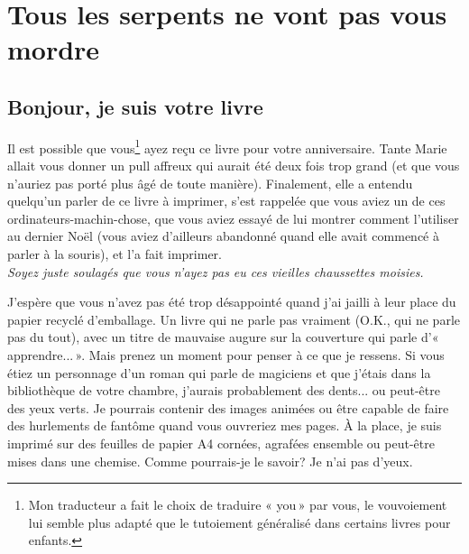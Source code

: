 


\mainmatter
\clearemptydoublepage
\chapter{Tous les serpents ne vont pas vous mor\-dre}
\section{Bonjour, je suis votre livre}
Il est possible que vous\footnote{Mon traducteur a fait le choix de traduire « you » par vous, le vouvoiement lui semble plus adapté que le tutoiement généralisé dans certains livres pour enfants.} ayez reçu ce livre pour votre anniversaire. Tante Marie allait vous donner un pull affreux qui aurait été deux fois trop grand (et que vous n'auriez pas porté plus âgé de toute manière). Finalement, elle a entendu quelqu'un parler de ce livre à imprimer, s'est rappelée que vous aviez un de ces ordinateurs-machin-chose, que vous aviez essayé de lui montrer comment l'utiliser au dernier Noël (vous aviez d'ailleurs abandonné quand elle avait commencé à parler à la souris), et l'a fait imprimer.
\\


\emph{Soyez juste soulagés que vous n'ayez pas eu ces vieilles chaussettes moisies.\\}


J'espère que vous n'avez pas été trop désappointé quand j'ai jailli à leur place du papier recyclé d'emballage.
Un livre qui ne parle pas vraiment (O.K., qui ne parle pas du tout), avec un titre de mauvaise augure sur la couverture 
qui parle d'« apprendre... ». Mais prenez un moment pour penser à ce que je ressens. Si vous étiez un personnage d'un roman qui parle de magiciens et que j'étais dans la bibliothèque de votre chambre, j'aurais probablement des dents... ou peut-être des yeux verts. Je pourrais contenir des images animées ou être capable de faire des hurlements de fantôme quand vous ouvreriez mes pages. À la place, je suis imprimé sur des feuilles de papier A4 cornées, agrafées ensemble ou peut-être mises dans une chemise. Comme pourrais-je le savoir? Je n'ai pas d'yeux.\\


